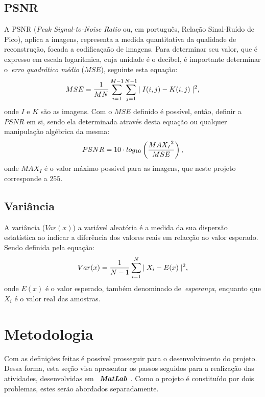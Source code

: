 \documentclass[conference]{Trabalho_3}
\begin{document}
\subsection{PSNR}
  \label{psnr}
A PSNR (\textit{Peak Signal-to-Noise Ratio} ou, em portugu\^es, Rela\c{c}\~ao Sinal-Ru\'ido de Pico), aplica a imagens, representa a medida quantitativa da qualidade de reconstru\c{c}\~ao, focada a codifica\c{c}a\~ao de imagens. Para determinar seu valor, que \'e expresso em escala logar\'itmica, cuja unidade \'e o decibel, \'e importante determinar o~\textit{erro quadr\'atico m\'edio} ($MSE$), seguinte esta equa\c{c}\~ao:
$$MSE = {{1} \over {MN}} \sum\limits_{i = 1}^{M - 1}\sum\limits_{j = 1}^{N - 1}{\mid I(i,j) - K(i,j) \mid ^ 2},$$ onde $I$ e $K$ s\~ao as imagens. Com o $MSE$ definido \'e poss\'ivel, ent\~ao, definir a $PSNR$ em si, sendo ela determinada atrav\'es desta equa\c{c}\~ao ou qualquer manipula\c{c}\~ao alg\'ebrica da mesma:
$$PSNR = 10 \cdot log_{10}\left({{MAX_I}^2 \over {MSE}}\right),$$ onde $MAX_I$ \'e o valor m\'aximo poss\'ivel para as imagens, que neste projeto corresponde a $255$.

\subsection{Vari\^ancia}
  \label{var}
A vari\^ancia ($Var(x)$) a vari\'avel aleat\'oria \'e a medida da sua dispers\~ao estat\'istica ao indicar a difer\^encia dos valores reais em relac\c{c}\~ao ao valor esperado. Sendo definida pela equa\c{c}\~ao:
$$Var(x) =  {{1} \over {N - 1}} \sum\limits_{i = 1}^{N}{\mid{X_i - E(x)}\mid^2},$$ onde $E(x)$ \'e o valor esperado, tamb\'em denominado de~\textit{esperan\c{c}a}, enquanto que $X_i$ \'e o valor real das amostras.

\section{Metodologia}
  \label{metodo}
Com as defini\c{c}\~oes feitas \'e poss\'ivel prosseguir para o desenvolvimento do projeto. Dessa forma, esta se\c{c}\~ao visa apresentar os passos seguidos para a realiza\c{c}\~ao das atividades, desenvolvidas em ~\textbf{\textit{MatLab}}~\cite{matlab}. Como o projeto \'e constitu\'ido por dois problemas, estes ser\~ao abordados separadamente.
\end{document}
